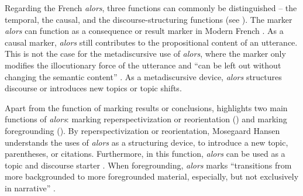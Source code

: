 \documentclass[output=paper]{langscibook}
\begin{document}
Regarding the French \textit{alors}, three functions can commonly be distinguished – the temporal, the causal, and the discourse-structuring functions (see \citealt{Degand.2011,LeDraoulec.2007,MosegaardHansen.1997}). The marker \textit{alors} can function as a consequence or result marker in Modern French \citep[9]{Degand.2011}. As a causal marker, \textit{alors} still contributes to the propositional content of an utterance. This is not the case for the metadiscursive use of \textit{alors}, where the marker only modifies the illocutionary force of the utterance and “can be left out without changing the semantic content” \citep[15]{Degand.2011}. As a metadiscursive device, \textit{alors} structures discourse or introduces new topics or topic shifts. 

Apart from the function of marking results or conclusions, \citeauthor{MosegaardHansen.1998} highlights two main functions of \textit{alors}: marking reperspectivization or reorientation (\citeyear[335]{MosegaardHansen.1998}) and marking foregrounding (\citeyear[348]{MosegaardHansen.1998}). By reperspectivization or reorientation, Mosegaard Hansen understands the uses of \textit{alors} as a structuring device, to introduce a new topic, parentheses, or citations. Furthermore, in this function, \textit{alors} can be used as a topic and discourse starter \citep[335]{MosegaardHansen.1998}. When foregrounding, \textit{alors} marks “transitions from more backgrounded to more foregrounded material, especially, but not exclusively in narrative” \citep[348]{MosegaardHansen.1998}. 
\end{document}
